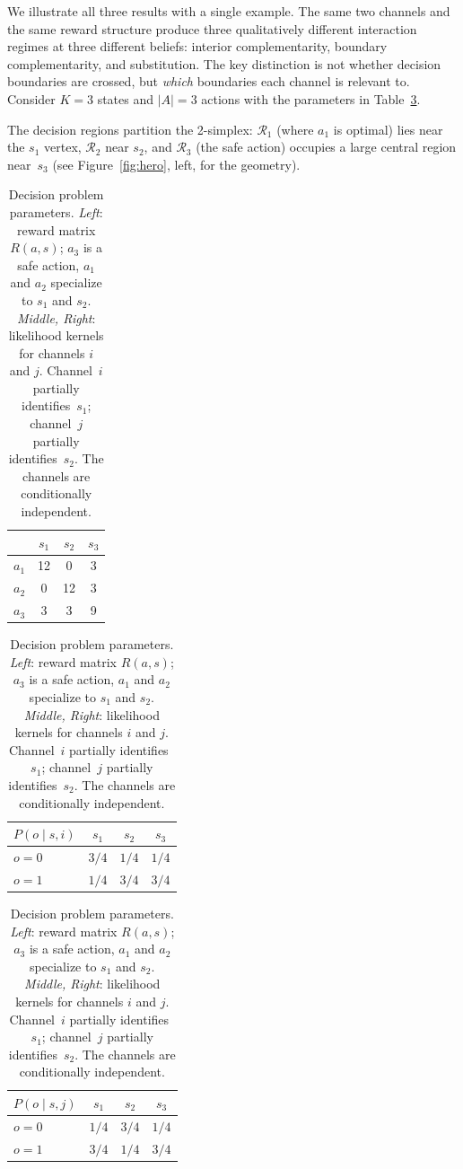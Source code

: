 \documentclass{article}
\begin{document}
We illustrate all three results with a single example. The same two channels and the same reward structure produce three qualitatively different interaction regimes at three different beliefs: interior complementarity, boundary complementarity, and substitution. The key distinction is not whether decision boundaries are crossed, but \emph{which} boundaries each channel is relevant to. Consider $K = 3$ states and $|A| = 3$ actions with the parameters in Table~\ref{tab:rewards}.

The decision regions partition the 2-simplex: $\mathcal{R}_1$ (where $a_1$ is optimal) lies near the $s_1$ vertex, $\mathcal{R}_2$ near $s_2$, and $\mathcal{R}_3$ (the safe action) occupies a large central region near~$s_3$ (see Figure~\ref{fig:hero}, left, for the geometry).

\begin{table}[b]
\centering
\begin{tabular}{@{}lccc@{}}
\toprule
       & $s_1$ & $s_2$ & $s_3$ \\
\midrule
$a_1$  & 12    & 0     & 3     \\
$a_2$  & 0     & 12    & 3     \\
$a_3$  & 3     & 3     & 9     \\
\bottomrule
\end{tabular}
\qquad
\begin{tabular}{@{}lccc@{}}
\toprule
$P(o \mid s, i)$ & $s_1$ & $s_2$ & $s_3$ \\
\midrule
$o = 0$ & $3/4$ & $1/4$ & $1/4$ \\
$o = 1$ & $1/4$ & $3/4$ & $3/4$ \\
\bottomrule
\end{tabular}
\qquad
\begin{tabular}{@{}lccc@{}}
\toprule
$P(o \mid s, j)$ & $s_1$ & $s_2$ & $s_3$ \\
\midrule
$o = 0$ & $1/4$ & $3/4$ & $1/4$ \\
$o = 1$ & $3/4$ & $1/4$ & $3/4$ \\
\bottomrule
\end{tabular}
\vspace{1em}
\caption{Decision problem parameters. \textit{Left}: reward matrix $R(a, s)$; $a_3$ is a safe action, $a_1$ and $a_2$ specialize to $s_1$ and $s_2$. \textit{Middle, Right}: likelihood kernels for channels $i$ and $j$. Channel~$i$ partially identifies~$s_1$; channel~$j$ partially identifies~$s_2$. The channels are conditionally independent.}
\label{tab:rewards}
\end{table}
\end{document}
